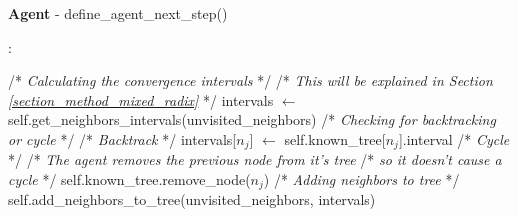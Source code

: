\begin{algorithm}
\caption{\textbf{Agent} - define\_agent\_next\_step()}
\label{alg:define_agent_next_step}
\begin{algorithmic}
    :

        \State /* \textit{Calculating the convergence intervals} */
        \State /* \textit{This will be explained in Section \ref{section_method_mixed_radix}} */
        \State intervals $\gets$ self.get\_neighbors\_intervals(unvisited\_neighbors)
        \State
        \State /* \textit{Checking for backtracking or cycle} */
                    \State /* \textit{Backtrack} */
                    \State intervals[$n_{j}$] $\gets$ self.known\_tree[$n_{j}$].interval
                \Else
                    \State /* \textit{Cycle} */
                    \State /* \textit{The agent removes the previous node from it's tree} 
                    \State /* \textit{so it doesn't cause a cycle} */
                    \State self.known\_tree.remove\_node($n_{j}$)
                \EndIf
            \EndIf
        \EndFor
        \State
        \State /* \textit{Adding neighbors to tree} */
        \State self.add\_neighbors\_to\_tree(unvisited\_neighbors, intervals)
\end{algorithmic}
\end{algorithm}
